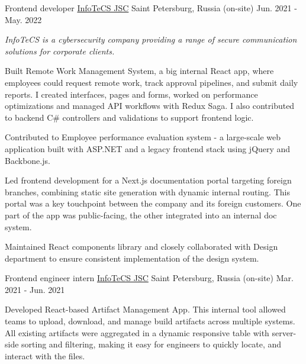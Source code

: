 \begin{cventries}
  \cventry
    {Frontend developer} %
    {\href{https://infotecs.ru/}{InfoTeCS JSC}}
    {Saint Petersburg, Russia (on-site)} %
    {Jun. 2021 - May. 2022} %
    {
      \begin{cvitems} %
      \vspace{8pt}
      \item[] {\small\textit{InfoTeCS is a cybersecurity company providing a range of secure communication solutions for corporate clients.}}
      \vspace{8pt}
        \item {Built Remote Work Management System, a big internal React app, where employees could request remote work, track approval pipelines, and submit daily reports. I created interfaces, pages and forms, worked on performance optimizations and managed API workflows with Redux Saga. I also contributed to backend C\# controllers and validations to support frontend logic. }
        \item {Contributed to Employee performance evaluation system - a large-scale web application built with ASP.NET and a legacy frontend stack using jQuery and Backbone.js.}
        \item {Led frontend development for a Next.js documentation portal targeting foreign branches, combining static site generation with dynamic internal routing. This portal was a key touchpoint between the company and its foreign customers. One part of the app was public-facing, the other integrated into an internal doc system.}
        \item {Maintained React components library and closely collaborated with Design department to ensure consistent implementation of the design system.}
      \end{cvitems}
    }
    {\vspace{16pt}}

  \cventry
    {Frontend engineer intern} %
    {\href{https://infotecs.ru/}{InfoTeCS JSC}}
    {Saint Petersburg, Russia (on-site)} %
    {Mar. 2021 - Jun. 2021} %
    {
      \begin{cvitems} %
        \item {Developed React-based Artifact Management App. This internal tool allowed teams to upload, download, and manage build artifacts across multiple systems. All existing artifacts were aggregated in a dynamic responsive table with server-side sorting and filtering, making it easy for engineers to quickly locate, and interact with the files.}
      \end{cvitems}
    }
    {\vspace{16pt}}


\end{cventries}
